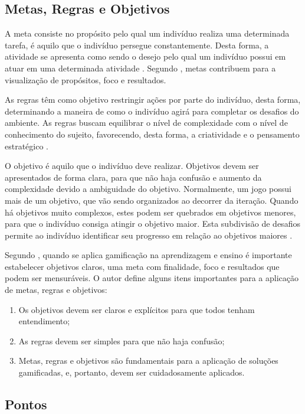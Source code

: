\documentclass[
	12pt,				%
	oneside,			%
	a4paper,			%
	english,			%
	french,				%
	spanish,			%
	brazil,				%
	]{abntex2}
\begin{document}
\subsection{Metas, Regras e Objetivos}

A meta consiste no propósito pelo qual um indivíduo realiza uma determinada tarefa, é aquilo que o indivíduo persegue constantemente. Desta forma, a atividade se apresenta como sendo o desejo pelo qual um indivíduo possui em atuar em uma determinada atividade \cite{bunchball2016gamification}. Segundo \citet{kaap:2014}, metas contribuem para a visualização de propósitos, foco e resultados.

As regras têm como objetivo restringir ações por parte do indivíduo, desta forma, determinando a maneira de como o indivíduo agirá para completar os desafios do ambiente. As regras buscam equilibrar o nível de complexidade com o nível de conhecimento do sujeito, favorecendo, desta forma, a criatividade e o pensamento estratégico \cite{bunchball2016gamification}.

O objetivo é aquilo que o indivíduo deve realizar. Objetivos devem ser apresentados de forma clara, para que não haja confusão e aumento da complexidade devido a ambiguidade do objetivo. Normalmente, um jogo possui mais de um objetivo, que vão sendo organizados ao decorrer da iteração. Quando há objetivos muito complexos, estes podem ser quebrados em objetivos menores, para que o indivíduo consiga atingir o objetivo maior. Esta subdivisão de desafios permite ao indivíduo identificar seu progresso em relação ao objetivos maiores \cite{fardo2013gamificaccao}.

Segundo \citet{andre2018}, quando se aplica gamificação na aprendizagem e ensino é importante estabelecer objetivos claros, uma meta com finalidade, foco e resultados que podem ser mensuráveis. O autor define alguns itens importantes para a aplicação de metas, regras e objetivos:

\begin{enumerate}
\item Os objetivos devem ser claros e explícitos para que todos tenham entendimento;
\item As regras devem ser simples para que não haja confusão;
\item Metas, regras e objetivos são fundamentais para a aplicação de soluções gamificadas, e, portanto, devem ser cuidadosamente aplicados.
\end{enumerate}

\subsection{Pontos}
\end{document}
